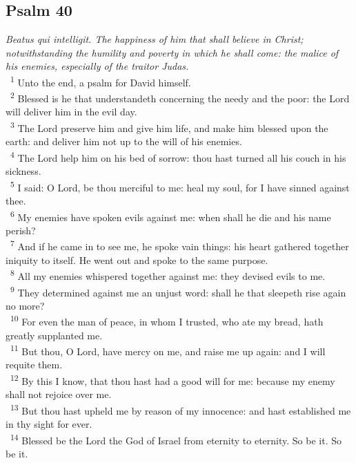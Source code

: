 \documentclass[a5paper,12pt]{article}
\begin{document}
\begin{multicols*}{2}
\section{Psalm 40}
\label{sec:orgdc7422f}
\emph{Beatus qui intelligit. The happiness of him that shall believe in Christ; notwithstanding the humility and poverty in which he shall come: the malice of his enemies, especially of the traitor Judas.}\\

~\textsuperscript{1} Unto the end, a psalm for David himself.\\
~\textsuperscript{2} Blessed is he that understandeth concerning the needy and the poor: the Lord will deliver him in the evil day.\\
~\textsuperscript{3} The Lord preserve him and give him life, and make him blessed upon the earth: and deliver him not up to the will of his enemies.\\
~\textsuperscript{4} The Lord help him on his bed of sorrow: thou hast turned all his couch in his sickness.\\
~\textsuperscript{5} I said: O Lord, be thou merciful to me: heal my soul, for I have sinned against thee.\\
~\textsuperscript{6} My enemies have spoken evils against me: when shall he die and his name perish?\\
~\textsuperscript{7} And if he came in to see me, he spoke vain things: his heart gathered together iniquity to itself. He went out and spoke to the same purpose.\\
~\textsuperscript{8} All my enemies whispered together against me: they devised evils to me.\\
~\textsuperscript{9} They determined against me an unjust word: shall he that sleepeth rise again no more?\\
~\textsuperscript{10} For even the man of peace, in whom I trusted, who ate my bread, hath greatly supplanted me.\\
~\textsuperscript{11} But thou, O Lord, have mercy on me, and raise me up again: and I will requite them.\\
~\textsuperscript{12} By this I know, that thou hast had a good will for me: because my enemy shall not rejoice over me.\\
~\textsuperscript{13} But thou hast upheld me by reason of my innocence: and hast established me in thy sight for ever.\\
~\textsuperscript{14} Blessed be the Lord the God of Israel from eternity to eternity. So be it. So be it.\\


\end{multicols*}
\end{document}
